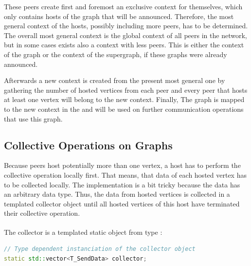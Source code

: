 These peers create first and foremost an exclusive context for
themselves, which only contains hosts of the graph that will be
announced.  Therefore, the most general context of the hosts, possibly
including more peers, has to be determined.  The overall most general
context is the global context of all peers in the network, but in some
cases exists also a context with less peers.  This is either the
context of the graph or the context of the supergraph, if these graphs
were already announced.

Afterwards a new context is created from the present most general one
by gathering the number of hosted vertices from each peer and every
peer that hosts at least one vertex will belong to the new context.
Finally, The graph is mapped to the new context in the  and
will be used on further communication operations that use this graph.


\subsection{Collective Operations on Graphs}
\label{sec:gvon_collective}

Because peers host potentially more than one vertex, a host has to
perform the collective operation locally first. That means, that data
of each hosted vertex has to be collected locally.  The implementation
is a bit tricky because the data has an arbitrary data type. Thus, the
data from hosted vertices is collected in a templated collector object
until all hosted vertices of this host have terminated their
collective operation.

\paragraph*{}
The collector is a templated static object from type :
\begin{lstlisting}[language=C++, label=lst:static_collective]
// Type dependent instanciation of the collector object
static std::vector<T_SendData> collector;
\end{lstlisting}

